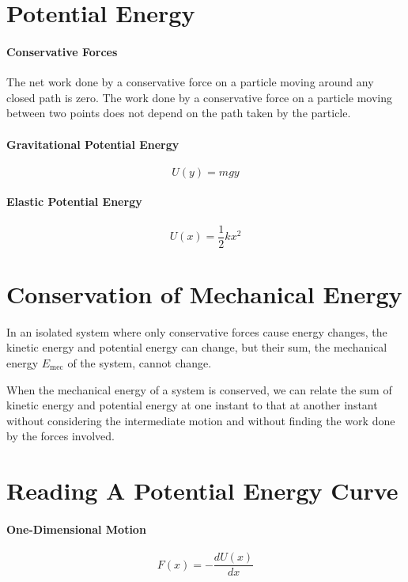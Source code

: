 \documentclass{article}
\begin{document}
    \section{Potential Energy}

        \paragraph{Conservative Forces}
        The net work done by a conservative force on a particle moving around any closed path is zero. The work done by a conservative force on a particle moving between two points does not depend on the path taken by the particle.

        \paragraph{Gravitational Potential Energy}
        \begin{equation}
            U(y) = m g y
        \end{equation}

        \paragraph{Elastic Potential Energy}
        \begin{equation}
            U(x) = \frac{1}{2} k x^2
        \end{equation}

    \section{Conservation of Mechanical Energy}

        In an isolated system where only conservative forces cause energy changes, the kinetic energy and potential energy can change, but their sum, the mechanical energy $E_\text{mec}$ of the system, cannot change.

        When the mechanical energy of a system is conserved, we can relate the sum of kinetic energy and potential energy at one instant to that at another instant without considering the intermediate motion and without finding the work done by the forces involved.

    \section{Reading A Potential Energy Curve}

        \paragraph{One-Dimensional Motion}
        \begin{equation}
            F(x) = - \frac{dU(x)}{dx}
        \end{equation}
\end{document}
